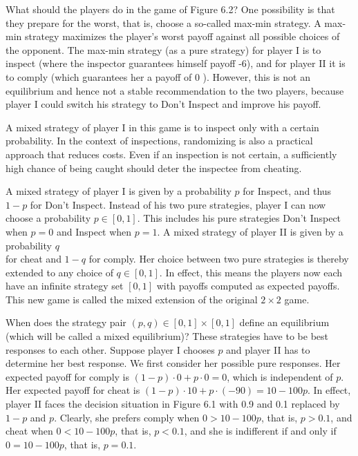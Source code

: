\documentclass[12pt]{article}
\begin{document}
What should the players do in the game of Figure 6.2? One possibility is that they prepare for the worst, that is, choose a so-called max-min strategy. A max-min strategy maximizes the player's worst payoff against all possible choices of the opponent. The max-min strategy (as a pure strategy) for player I is to inspect (where the inspector guarantees himself payoff -6), and for player II it is to comply (which guarantees her a payoff of 0 ). However, this is not an equilibrium and hence not a stable recommendation to the two players, because player I could switch his strategy to Don't Inspect and improve his payoff.

A mixed strategy of player I in this game is to inspect only with a certain probability. In the context of inspections, randomizing is also a practical approach that reduces costs. Even if an inspection is not certain, a sufficiently high chance of being caught should deter the inspectee from cheating.

A mixed strategy of player I is given by a probability $p$ for Inspect, and thus $1-p$ for Don't Inspect. Instead of his two pure strategies, player I can now choose a probability $p \in[0,1]$. This includes his pure strategies Don't Inspect when $p=0$ and Inspect when $p=1$. A mixed strategy of player II is given by a probability $q$\\
for cheat and $1-q$ for comply. Her choice between two pure strategies is thereby extended to any choice of $q \in[0,1]$. In effect, this means the players now each have an infinite strategy set $[0,1]$ with payoffs computed as expected payoffs. This new game is called the mixed extension of the original $2 \times 2$ game.

When does the strategy pair $(p, q) \in[0,1] \times[0,1]$ define an equilibrium (which will be called a mixed equilibrium)? These strategies have to be best responses to each other. Suppose player I chooses $p$ and player II has to determine her best response. We first consider her possible pure responses. Her expected payoff for comply is $(1-p) \cdot 0+p \cdot 0=0$, which is independent of $p$. Her expected payoff for cheat is $(1-p) \cdot 10+p \cdot(-90)=10-100 p$. In effect, player II faces the decision situation in Figure 6.1 with 0.9 and 0.1 replaced by $1-p$ and $p$. Clearly, she prefers comply when $0>10-100 p$, that is, $p>0.1$, and cheat when $0<10-100 p$, that is, $p<0.1$, and she is indifferent if and only if $0=10-100 p$, that is, $p=0.1$.
\end{document}
